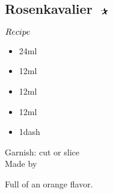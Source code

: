 \subsection{Rosenkavalier $\openbigstar$}
\begin{itembox}[l]{\boldmath $Recipe$}
\begin{itemize}
\setlength{\parskip}{0cm}
\setlength{\itemsep}{0cm}
\item \gin 24ml
\item \vermouth 12ml
\item \oc 12ml
\item \oj 12ml
\item \gs 1dash
\end{itemize}
\vspace{-4mm}
Garnish: \orange cut or slice\\
Made by \shake
\end{itembox}
Full of an orange flavor.
